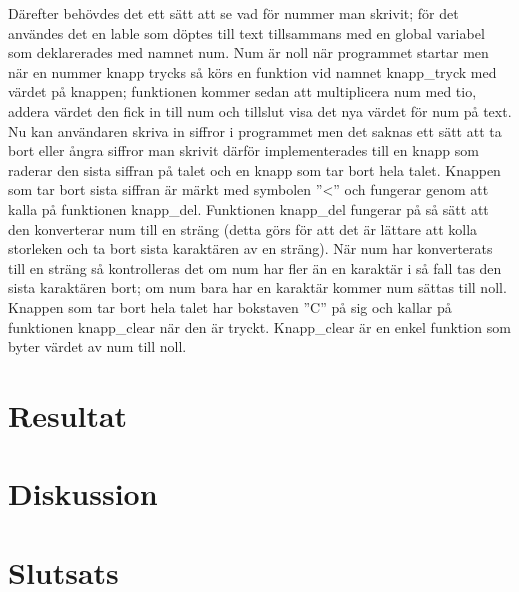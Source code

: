 \documentclass[a4paper, 12pt]{article}
\begin{document}
Därefter behövdes det ett sätt att se vad för nummer man skrivit; för det användes det en lable som döptes till text tillsammans med en global variabel som deklarerades med namnet num.
Num är noll när programmet startar men när en nummer knapp trycks så körs en funktion vid namnet knapp\_tryck med värdet på knappen; funktionen kommer sedan att multiplicera num med tio, addera värdet den fick in till num och tillslut visa det nya värdet för num på text. 
Nu kan användaren skriva in siffror i programmet men det saknas ett sätt att ta bort eller ångra siffror man skrivit därför implementerades till en knapp som raderar den sista siffran på talet och en knapp som tar bort hela talet.
Knappen som tar bort sista siffran är märkt med symbolen ''\textless'' och fungerar genom att kalla på funktionen knapp\_del. Funktionen knapp\_del fungerar på så sätt att den konverterar num till en sträng (detta görs för att det är lättare att kolla storleken och ta bort sista karaktären av en sträng). 
När num har konverterats till en sträng så kontrolleras det om num har fler än en karaktär i så fall tas den sista karaktären bort; om num bara har en karaktär kommer num sättas till noll.
Knappen som tar bort hela talet har bokstaven ''C'' på sig och kallar på funktionen knapp\_clear när den är tryckt. Knapp\_clear är en enkel funktion som byter värdet av num till noll.


\section{Resultat}

\section{Diskussion}

\section{Slutsats}

\newpage 

%

\printbibliography
\end{document}
